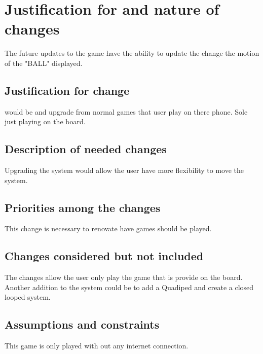 
\chapter{Justification for and nature of changes}
\label{loc:Justification for and nature of changes}


The future updates to the game have the ability to update the change the motion of the "BALL" displayed.

\section{Justification for change}
\label{loc:Justification for change}


\ThisSystem would be and upgrade from normal games that user play on there phone. Sole just playing on the board.

\section{Description of needed changes}
\label{loc:Description of needed changes}


Upgrading the system would allow the user have more flexibility to move the system.

\section{Priorities among the changes}
\label{loc:Priorities among the changes}
% 

This change is necessary to renovate have games should be played.

\section{Changes considered but not included}
\label{loc:Changes considered but not included}


The changes allow the user only play the game that is provide on the board. Another addition to the system could be to add a Quadiped and create a closed looped system.

\section{Assumptions and constraints}
\label{loc:Assumptions and constraints}


This game is only played with out any internet connection.